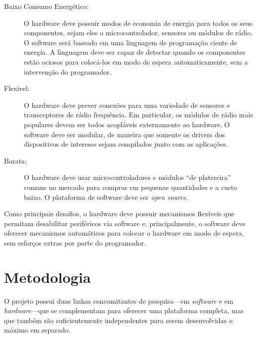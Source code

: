 \documentclass[titlepage,12pt]{article}
\begin{document}
\begin{description}
%
\item[Baixo Consumo Energético:]
  O hardware deve possuir modos de economia de energia para todos os seus
  componentes, sejam eles o microcontrolador, sensores ou módulos de rádio.
  O software será baseado em uma linguagem de programação ciente de energia.
  A linguagem deve ser capaz de detectar quando os componentes estão ociosos
  para colocá-los em modo de espera automaticamente, sem a intervenção do
  programador.
%
\item[Flexível:]
  O hardware deve prever conexões para uma variedade de sensores e
  transceptores de rádio frequência.
  Em particular, os módulos de rádio mais populares devem ser todos acopláveis
  externamente ao hardware.
  O software deve ser modular, de maneira que somente os drivers dos
  dispositivos de interesse sejam compilados junto com as aplicações.
%
\item[Barata:]
  O hardware deve usar microcontroladores e módulos ``de platereira'' comuns no
  mercado para compras em pequenas quantidades e a custo baixo.
  O plataforma de software deve ser \emph{open source}.
%
\end{description}

Como principais desafios, o hardware deve possuir mecanismos flexíveis que
permitam desabilitar periféricos via software e, principalmente, o software
deve oferecer mecanismos automáticos para colocar o hardware em modo de espera,
sem esforços extras por parte do programador.

\section{Metodologia}

O projeto possui duas linhas concomitantes de pesquisa---em \emph{software} e
em \emph{hardware}---que se complementam para oferecer uma plataforma completa,
mas que também são suficientemente independentes para serem desenvolvidas o
máximo em separado.
\end{document}
